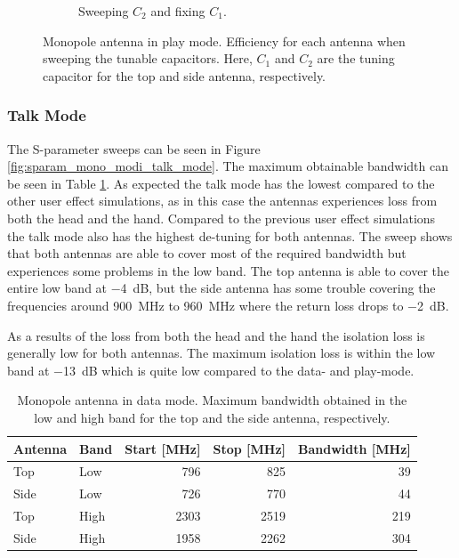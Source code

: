 \begin{figure}[htbp]
\begin{subfigure}{0.49\linewidth}
        \caption{Sweeping $C_2$ and fixing $C_1$.}
    \end{subfigure}
    \caption{Monopole antenna in play mode. Efficiency for each antenna when sweeping the tunable capacitors. Here, $C_1$ and $C_2$ are the tuning capacitor for the top and side antenna, respectively.}
    \label{fig:eff_mono_modi_play_mode}
\end{figure}

\FloatBarrier
\subsubsection{Talk Mode}
The S-parameter sweeps can be seen in Figure \ref{fig:sparam_mono_modi_talk_mode}. The maximum obtainable bandwidth can be seen in Table \ref{tab:bw_mono_modi_tm}. As expected the talk mode has the lowest compared to the other user effect simulations, as in this case the antennas experiences loss from both the head and the hand. Compared to the previous user effect simulations the talk mode also has the highest de-tuning for both antennas. The sweep shows that both antennas are able to cover most of the required bandwidth but experiences some problems in the low band. The top antenna is able to cover the entire low band at \SI{-4}{dB}, but the side antenna has some trouble covering the frequencies around \SI{900}{MHz} to \SI{960}{MHz} where the return loss drops to \SI{-2}{dB}.

As a results of the loss from both the head and the hand the isolation loss is generally low for both antennas. The maximum isolation loss is within the low band at \SI{-13}{dB} which is quite low compared to the data- and play-mode.  

\begin{table}[htbp]
  \centering
  \begin{tabular}{|l|l|r|r|r|}
    \hline
    Antenna & Band & Start [MHz] & Stop [MHz] & Bandwidth [MHz] \\
    \hline
    Top     & Low  &  796  & 825  & 39 \\
    Side    & Low  &  726  & 770  & 44  \\
    \hline
    Top     & High &  2303 &  2519  & 219 \\
    Side    & High &  1958 &  2262 & 304 \\
    \hline
  \end{tabular}
  \caption{Monopole antenna in data mode. Maximum bandwidth obtained in the low and high band for the top and the side antenna, respectively.}    
  \label{tab:bw_mono_modi_tm}
\end{table}

